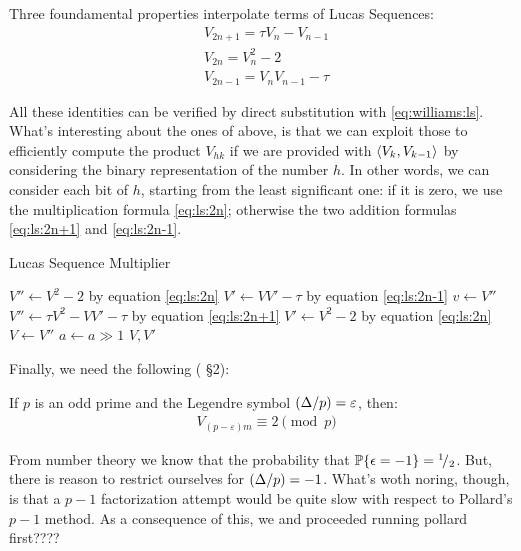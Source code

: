 Three foundamental properties interpolate terms of Lucas Sequences:
\begin{align}
  & V_{2n+1} = \tau V_n - V_{n-1} \label{eq:ls:2n+1}\\
  & V_{2n} = V_n^2 - 2 \label{eq:ls:2n}\\
  & V_{2n-1} = V_nV_{n-1} - \tau \label{eq:ls:2n-1}
\end{align}

All these identities can be verified by direct substitution with
\ref{eq:williams:ls}. What's interesting about the ones of above, is that we can
exploit those to efficiently compute the product $V_{hk}$ if we are provided with
$\langle V_k, V_{k-1}\rangle$ by considering the binary representation of the number
$h$. In other words, we can consider each bit of $h$, starting from the least
significant one: if it is zero, we use the multiplication formula
\ref{eq:ls:2n}; otherwise the two addition formulas \ref{eq:ls:2n+1} and
\ref{eq:ls:2n-1}.

\begin{algorithm}[H]
  \caption{Lucas Sequence Multiplier}
  \begin{algorithmic}[1]
          \State $V'' \gets V^2 -2$
          \Comment by equation \ref{eq:ls:2n}
          \State $V' \gets VV' - \tau$
          \Comment by equation \ref{eq:ls:2n-1}
          \State $v \gets V''$
          \State $V'' \gets \tau V^2 - VV' - \tau$
          \Comment by equation \ref{eq:ls:2n+1}
          \State $V' \gets V^2 -2$
          \Comment by equation \ref{eq:ls:2n}
          \State $V \gets V''$
        \EndIf
        \State $a \gets a \gg 1$
      \EndWhile
      \State \Return $V, V'$
    \EndFunction
  \end{algorithmic}
\end{algorithm}

Finally, we need the following (\cite{Williams:p+1} \S 2):
\begin{theorem*}[Lehmer]
  If $p$ is an odd prime and the Legendre symbol
  $({\Delta}/{p}) = \varepsilon$, then:
  \begin{align*}
  &  V_{(p - \varepsilon)m} \equiv 2 \pmod{p}
  \end{align*}
\end{theorem*}



\begin{remark}
  From number theory we know that the probability that
  $\mathbb{P}\{\epsilon = -1\} = {}^{1}\!/_{2}$.
  But, there is reason to restrict ourselves for $({\Delta}/{p}) = -1$.
  What's woth noring, though, is that a $p-1$ factorization attempt would be
  quite slow with respect to Pollard's $p-1$ method. As a consequence of this,
  we and \cite{Williams:p+1} proceeded running pollard first????
\end{remark}



